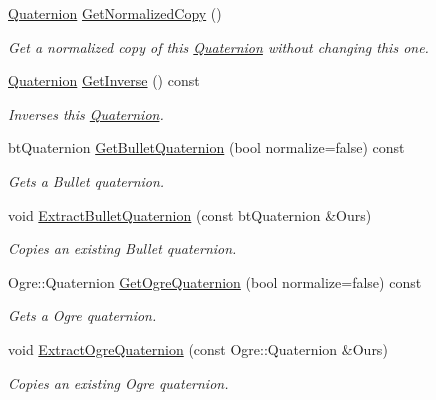 \begin{DoxyCompactItemize}
\hyperlink{classphys_1_1Quaternion}{Quaternion} \hyperlink{classphys_1_1Quaternion_a70d6cf4b57f3e74469089747ef755583}{GetNormalizedCopy} ()
\begin{DoxyCompactList}\small\item\em Get a normalized copy of this \hyperlink{classphys_1_1Quaternion}{Quaternion} without changing this one. \item\end{DoxyCompactList}\item 
\hyperlink{classphys_1_1Quaternion}{Quaternion} \hyperlink{classphys_1_1Quaternion_a384833001b14c132553af190e6ebc41e}{GetInverse} () const 
\begin{DoxyCompactList}\small\item\em Inverses this \hyperlink{classphys_1_1Quaternion}{Quaternion}. \item\end{DoxyCompactList}\item 
btQuaternion \hyperlink{classphys_1_1Quaternion_a053f994770b600ae153a142bb4ba7d33}{GetBulletQuaternion} (bool normalize=false) const 
\begin{DoxyCompactList}\small\item\em Gets a Bullet quaternion. \item\end{DoxyCompactList}\item 
void \hyperlink{classphys_1_1Quaternion_a10d3582b2731e70279d7bab43173f317}{ExtractBulletQuaternion} (const btQuaternion \&Ours)
\begin{DoxyCompactList}\small\item\em Copies an existing Bullet quaternion. \item\end{DoxyCompactList}\item 
Ogre::Quaternion \hyperlink{classphys_1_1Quaternion_aa22645e2e2972007bcf61cd2f8e506d0}{GetOgreQuaternion} (bool normalize=false) const 
\begin{DoxyCompactList}\small\item\em Gets a Ogre quaternion. \item\end{DoxyCompactList}\item 
void \hyperlink{classphys_1_1Quaternion_a942fab675a0b124e1dc5e2febab113e6}{ExtractOgreQuaternion} (const Ogre::Quaternion \&Ours)
\begin{DoxyCompactList}\small\item\em Copies an existing Ogre quaternion. \item\end{DoxyCompactList}\item 

\end{DoxyCompactItemize}
